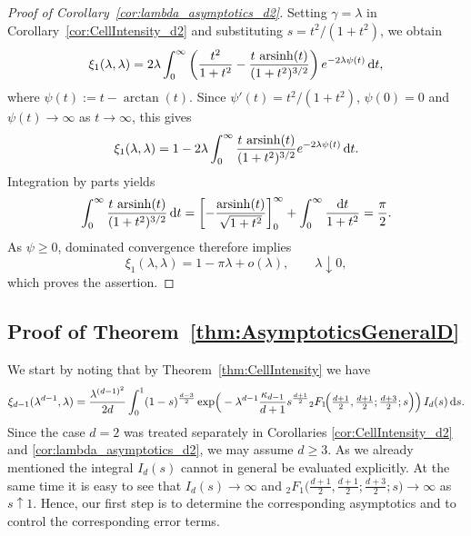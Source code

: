 \documentclass[11pt,a4paper]{article}
\theoremstyle{plain}
\theoremstyle{definition}
\theoremstyle{remark}
\newcommand{\dint}{\textup{d}}
\begin{document}
\begin{proof}[Proof of Corollary~\ref{cor:lambda_asymptotics_d2}]
Setting $\gamma=\lambda$ in Corollary~\ref{cor:CellIntensity_d2}
and substituting $s=t^2/(1+t^2)$, we obtain
\[
    \xi_1(\lambda,\lambda)
    =2\lambda\int_0^\infty
    \left(
        \frac{t^2}{1+t^2}
        -\frac{t\,\operatorname{arsinh}(t)}{(1+t^2)^{3/2}}
    \right)e^{-2\lambda\psi(t)}\,\dint t,
\]
where $\psi(t):=t-\arctan(t)$. Since
$\psi'(t)=t^2/(1+t^2)$, $\psi(0)=0$ and
$\psi(t)\to\infty$ as $t\to\infty$, this gives
\[
    \xi_1(\lambda,\lambda)
    =1-2\lambda\int_0^\infty
    \frac{t\,\operatorname{arsinh}(t)}{(1+t^2)^{3/2}}
    e^{-2\lambda\psi(t)}\,\dint t.
\]
Integration by parts yields
\[
    \int_0^\infty
    \frac{t\,\operatorname{arsinh}(t)}{(1+t^2)^{3/2}}\,\dint t
    =
    \left[-\frac{\operatorname{arsinh}(t)}{\sqrt{1+t^2}}
    \right]_0^\infty
    +\int_0^\infty\frac{\dint t}{1+t^2}
    =\frac{\pi}{2}.
\]
As $\psi\geq0$, dominated convergence therefore implies
\[
    \xi_1(\lambda,\lambda)
    =1-\pi\lambda+o(\lambda),
    \qquad \lambda\downarrow0,
\]
which proves the assertion.
\end{proof}

\subsection{Proof of Theorem~\ref{thm:AsymptoticsGeneralD}}

We start by noting that by Theorem~\ref{thm:CellIntensity} we have
\begin{equation}\label{eq:CellIntensity1}
	\xi_{d-1}(\lambda^{d-1},\lambda) =\frac{\lambda^{(d-1)^2}}{2d}
	\int_0^1 (1-s)^{\frac{d-3}{2}}
	\exp\!\Big(
	-\lambda^{d-1}\frac{\kappa_{d-1}}{d+1}
	s^{\frac{d+1}{2}}
	{}_2F_1\!\Big(\tfrac{d+1}{2},\tfrac{d+1}{2};\tfrac{d+3}{2};s\Big)
	\Big)\,I_d(s)\,\dint s.
\end{equation}
Since the case $d=2$ was treated separately in Corollaries
\ref{cor:CellIntensity_d2} and \ref{cor:lambda_asymptotics_d2}, we may assume $d\ge 3$. As we already mentioned the integral $I_d(s)$ cannot in general be evaluated explicitly. At the same time it is easy to see that $I_d(s)\to\infty$ and ${}_2F_1\!\big(\tfrac{d+1}{2},\tfrac{d+1}{2};\tfrac{d+3}{2};s\big)\to\infty$ as $s\uparrow 1$. Hence, our first step is to determine the corresponding asymptotics and to control the corresponding error terms.
\end{document}
